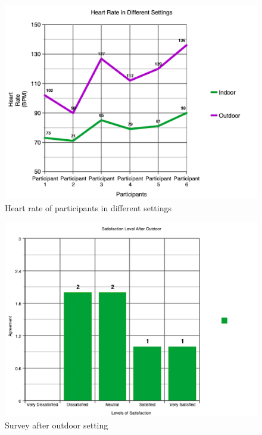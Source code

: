 \documentclass{sigchi}
\begin{document}
\begin{figure}
    \centering
    \includegraphics[scale=0.45]{figures/Heart_rate.png}
    \caption{Heart rate of participants in different settings}
    \label{fig:my_label8}
\end{figure}

\begin{figure}
    \centering
    \includegraphics[scale=0.4]{figures/Outdoor_setting.png}
    \caption{Survey after outdoor setting}
    \label{fig:my_label9}
\end{figure}
\end{document}
